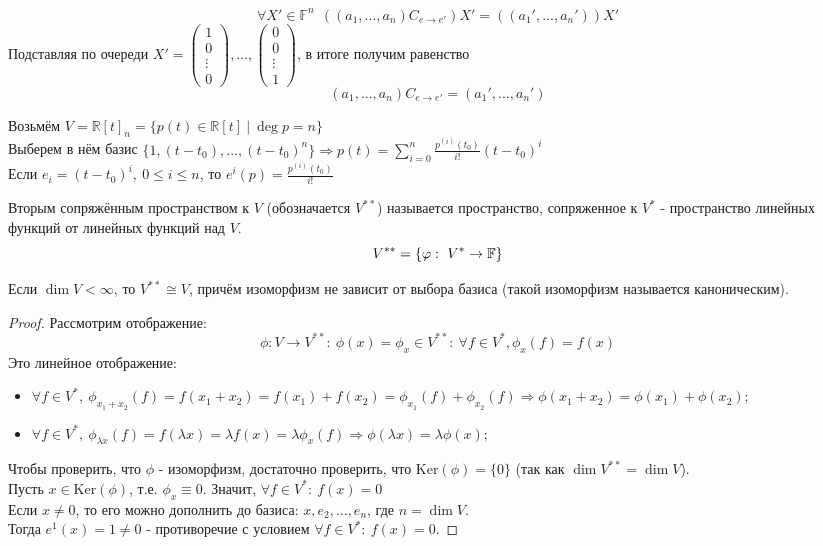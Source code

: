     $$\forall X' \in \mathbb{F}^n \ \ ((a_1,...,a_n)C_{e\rightarrow e'})X' = ((a_1',...,a_n'))X'$$ 
    Подставляя по очереди $X' = \left( \begin{smallmatrix} 1 \\ 0 \\ \vdots \\ 0 \end{smallmatrix} \right), \dots , \left( \begin{smallmatrix} 0 \\ 0 \\ \vdots \\ 1 \end{smallmatrix}\right)$, в итоге получим равенство \[(a_1,...,a_n)C_{e\rightarrow e'} = (a_1',...,a_n')\]

    \begin{example1}
        Возьмём $V = \mathbb{R}[t]_n = \{p(t) \in \mathbb{R}[t] \ | \ \deg p = n\}$\\
        Выберем в нём базис $\{1, (t-t_0), ... , (t-t_0)^n\} \Longrightarrow  p(t) = \sum \limits_{i=0}^n \frac{p^{(i)}(t_0)}{i!}(t-t_0)^i$\\
        Если $e_i = (t-t_0)^i, \ 0\leqslant i\leqslant n$, то $e^i(p) = \frac{p^{(i)}(t_0)}{i!}$
    \end{example1}
    \begin{definition}
        Вторым сопряжённым пространством к $V$ (обозначается $V^{**}$) называется пространство, сопряженное к $V^{*}$ - пространство линейных функций от линейных функций над $V$.
        $$V^{**} = \{\varphi: \ V^{*} \to \mathbb{F}\}$$ 
    \end{definition}
    \begin{theorem}
        Если $\dim V < \infty$, то $V^{**} \cong V$, причём изоморфизм не зависит от выбора базиса (такой изоморфизм называется каноническим). 
    \end{theorem}
    \begin{proof}
        Рассмотрим отображение: 
        $$\phi: V \rightarrow V^{**}: \ \phi(x) = \phi_x \in V^{**} : \ \forall f\in V^{*}, \phi_x(f) = f(x)$$
        Это линейное отображение:
        \begin{itemize}
            \item $\forall f\in V^{*}, \ \phi_{x_1+x_2}(f) = f(x_1 + x_2) = f(x_1) + f(x_2) = \phi_{x_1}(f) + \phi_{x_2}(f) \Longrightarrow  \phi(x_1 + x_2) = \phi(x_1) + \phi(x_2);$ 
            \item $\forall f\in V^{*}, \ \phi_{\lambda x}(f) = f(\lambda x) = \lambda f(x) = \lambda\phi_{x}(f) \Longrightarrow \phi(\lambda x) = \lambda\phi(x);$ 
        \end{itemize}
        Чтобы проверить, что $\phi$ - изоморфизм, достаточно проверить, что $\text{Ker} (\phi) = \{0\}$ (так как $\dim V^{**} = \dim V$).\\
        Пусть $x \in \text{Ker} (\phi)$, т.е. $\phi_x \equiv 0$. Значит,  $\forall f \in V^{*} : \ f(x) = 0$\\
        Если $x \neq 0$, то его можно дополнить до базиса: $x, e_2, ... , e_n$, где $n = \dim V$.\\
        Тогда $e^1(x) = 1 \neq 0$ - противоречие с условием $\forall f \in V^{*} : \ f(x) = 0$.
    \end{proof}
